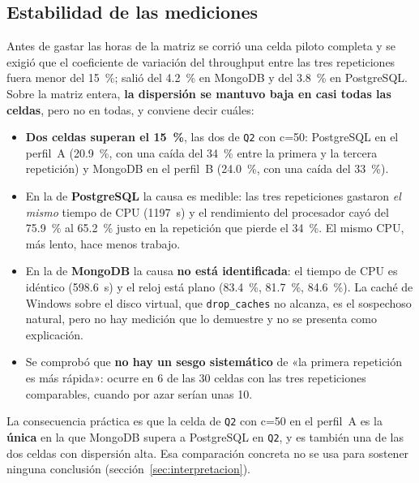 \subsection{Estabilidad de las mediciones}
\label{sec:estabilidad}

Antes de gastar las horas de la matriz se corrió una celda piloto completa y se
exigió que el coeficiente de variación del throughput entre las tres repeticiones
fuera menor del 15~\%; salió del 4.2~\% en MongoDB y del 3.8~\% en PostgreSQL.
Sobre la matriz entera, \textbf{la dispersión se mantuvo baja en casi todas las
celdas}, pero no en todas, y conviene decir cuáles:

\begin{itemize}
  \item \textbf{Dos celdas superan el 15~\%}, las dos de \texttt{Q2} con
        \mbox{c=50}: PostgreSQL en el perfil~A (20.9~\%, con una caída del 34~\%
        entre la primera y la tercera repetición) y MongoDB en el perfil~B
        (24.0~\%, con una caída del 33~\%).
  \item En la de \textbf{PostgreSQL} la causa es medible: las tres repeticiones
        gastaron \emph{el mismo} tiempo de CPU (1197~s) y el rendimiento del
        procesador cayó del 75.9~\% al 65.2~\% justo en la repetición que pierde el
        34~\%. El mismo CPU, más lento, hace menos trabajo.
  \item En la de \textbf{MongoDB} la causa \textbf{no está identificada}: el
        tiempo de CPU es idéntico (598.6~s) y el reloj está plano (83.4~\%,
        81.7~\%, 84.6~\%). La caché de Windows sobre el disco virtual, que
        \texttt{drop\_caches} no alcanza, es el sospechoso natural, pero no hay
        medición que lo demuestre y no se presenta como explicación.
  \item Se comprobó que \textbf{no hay un sesgo sistemático} de «la primera
        repetición es más rápida»: ocurre en 6 de las 30 celdas con las tres
        repeticiones comparables, cuando por azar serían unas 10.
\end{itemize}

La consecuencia práctica es que la celda de \texttt{Q2} con \mbox{c=50} en el
perfil~A es la \textbf{única} en la que MongoDB supera a PostgreSQL en
\texttt{Q2}, y es también una de las dos celdas con dispersión alta. Esa
comparación concreta no se usa para sostener ninguna conclusión
(sección~\ref{sec:interpretacion}).
